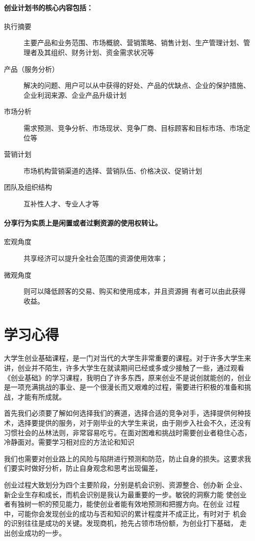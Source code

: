 \documentclass[UTF8]{ctexart}
\begin{document}
\paragraph{创业计划书的核心内容包括：}
\begin{description}
\item [执行摘要]主要产品和业务范围、市场概貌、营销策略、销售计划、生产管理计划、管理者及其组织、财务计划、资金需求状况等
\item [产品（服务分析）]解决的问题、用户可以从中获得的好处、产品的优缺点、企业的保护措施、企业利润来源、企业产品升级计划
\item [市场分析] 需求预测、竞争分析、市场现状、竞争厂商、目标顾客和目标市场、市场定位等
\item [营销计划]市场机构营销渠道的选择、营销队伍、价格决议、促销计划
\item[团队及组织结构] 互补性人才、专业人才等
\end{description} 
\paragraph{分享行为实质上是闲置或者过剩资源的使用权转让。}
\begin{description}
 \item[宏观角度]共享经济可以提升全社会范围的资源使用效率；
 \item[微观角度]则可以降低顾客的交易、购买和使用成本，并且资源拥
有者可以由此获得收益。
\end{description}
\section{学习心得}
大学生创业基础课程，是一门对当代的大学生非常重要的课程。对于许多大学生来讲，创业并不陌生，许多大学生在就读期间已经或多或少接触了一些，通过观看《创业基础》的学习课程，我明白了许多东西，原来创业不是说创就能创的，创业是一项充满挑战的事业、是一个很漫长而又艰难的过程，需要进行积极的准备和挑战，才能有所成就。

首先我们必须要了解如何选择我们的赛道，选择合适的竞争对手，选择提供何种技术，选择要提供的服务，对于刚毕业的大学生来说，由于刚步入社会不久，还没有习惯社会的丛林法则，非常容易吃亏。在面对困难和挑战时需要创业者稳住心态，冷静面对。需要学习相对应的方法论和知识

我们也需要对创业路上的风险与陷阱进行预测和防范，防止自身的损失。这要求我们要实时做好分析，防止自身观念和思考出现偏差，

创业过程大致划分为四个主要阶段，分别是机会识别、资源整合、创办新
企业、新企业生存和成长，而机会识别是我认为最重要的一步。敏锐的洞察力能
使创业者有独树一帜的预见能力，能使创业者能有效地预测和把握方向。在创业
过程中，可能你会发现创业的成功与否和知识的累计程度并不成正比，有时对于
机会的识别往往是成功的关键。发现商机，抢先占领市场份额，为创业打下基础，
走出创业成功的一步。 
\end{document}
